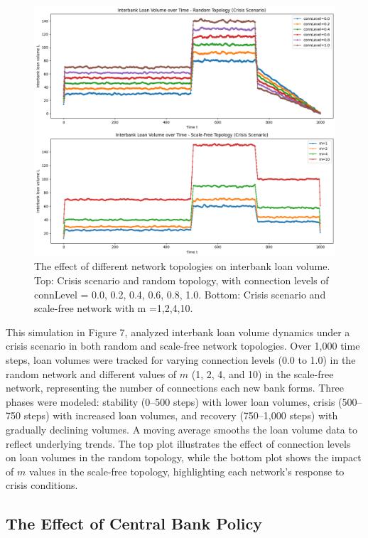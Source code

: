 \documentclass{article} %
\begin{document}
\begin{figure}[h]
    \centering
    \includegraphics[width=1.0\linewidth]{Figures/Figure_4.png}
    \caption{The effect of different network topologies on interbank loan volume. Top: Crisis scenario and random topology, with connection levels of connLevel = 0.0, 0.2, 0.4, 0.6, 0.8, 1.0. Bottom: Crisis scenario and scale-free network with m =1,2,4,10.
}
    \label{fig:figure4}
\end{figure}
This simulation in Figure 7, analyzed interbank loan volume dynamics under a crisis scenario in both random and scale-free network topologies. Over 1,000 time steps, loan volumes were tracked for varying connection levels (0.0 to 1.0) in the random network and different values of \( m \) (1, 2, 4, and 10) in the scale-free network, representing the number of connections each new bank forms. Three phases were modeled: stability (0--500 steps) with lower loan volumes, crisis (500--750 steps) with increased loan volumes, and recovery (750--1,000 steps) with gradually declining volumes. A moving average smooths the loan volume data to reflect underlying trends. The top plot illustrates the effect of connection levels on loan volumes in the random topology, while the bottom plot shows the impact of \( m \) values in the scale-free topology, highlighting each network's response to crisis conditions.

\subsection{The Effect of Central Bank Policy}
\end{document}

